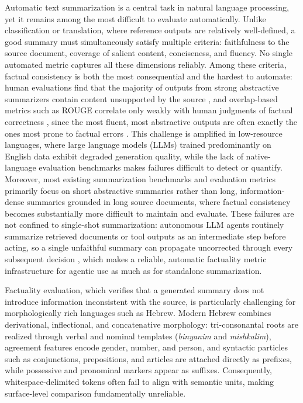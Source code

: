 \documentclass[11pt]{article}
\begin{document}
Automatic text summarization is a central task in natural language processing, yet it remains among the most difficult to evaluate automatically. 
Unlike classification or translation, where reference outputs are relatively well-defined, a good summary must simultaneously satisfy multiple criteria: faithfulness to the source document, coverage of salient content, conciseness, and fluency. 
No single automated metric captures all these dimensions reliably.
Among these criteria, factual consistency is both the most consequential and the hardest to automate: human evaluations find that the majority of outputs from strong abstractive summarizers contain content unsupported by the source \citep{maynez-etal-2020-faithfulness}, and overlap-based metrics such as ROUGE correlate only weakly with human judgments of factual correctness \citep{kryscinski-etal-2019-neural}, since the most fluent, most abstractive outputs are often exactly the ones most prone to factual errors \citep{falke-etal-2019-ranking}.
This challenge is amplified in low-resource languages, where large language models (LLMs) trained predominantly on English data exhibit degraded generation quality, while the lack of native-language evaluation benchmarks makes failures difficult to detect or quantify.
Moreover, most existing summarization benchmarks and evaluation metrics primarily focus on short abstractive summaries rather than long, information-dense summaries grounded in long source documents, where factual consistency becomes substantially more difficult to maintain and evaluate.
These failures are not confined to single-shot summarization: autonomous LLM agents routinely summarize retrieved documents or tool outputs as an intermediate step before acting, so a single unfaithful summary can propagate uncorrected through every subsequent decision \citep{lin2025agenthallucination}, which makes a reliable, automatic factuality metric infrastructure for agentic use as much as for standalone summarization.

Factuality evaluation, which verifies that a generated summary does not introduce information inconsistent with the source, is particularly challenging for morphologically rich languages such as Hebrew.
Modern Hebrew combines derivational, inflectional, and concatenative morphology: tri-consonantal roots are realized through verbal and nominal templates (\textit{binyanim} and \textit{mishkalim}), agreement features encode gender, number, and person, and syntactic particles such as conjunctions, prepositions, and articles are attached directly as prefixes, while possessive and pronominal markers appear as suffixes. Consequently, whitespace-delimited tokens often fail to align with semantic units, making surface-level comparison fundamentally unreliable.
\end{document}
